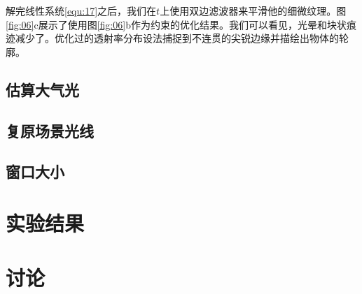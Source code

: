 \documentclass{ctexart}
\begin{document}
解完线性系统\ref{equ:17}之后，我们在$t$上使用双边滤波器来平滑他的细微纹理。图\ref{fig:06}c展示了使用图\ref{fig:06}b作为约束的优化结果。我们可以看见，光晕和块状痕迹减少了。优化过的透射率分布设法捕捉到不连贯的尖锐边缘并描绘出物体的轮廓。\par

\subsection{估算大气光}\label{sec:4.3}

\subsection{复原场景光线}

\subsection{窗口大小}


\section{实验结果}

\section{讨论}




\end{document}
